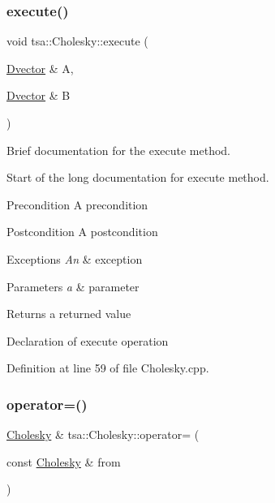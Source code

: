 \subsubsection{\texorpdfstring{execute()}{execute()}}
{\footnotesize\ttfamily void tsa\+::\+Cholesky\+::execute (\begin{DoxyParamCaption}\item[{\hyperlink{namespacetsa_a8900fb03d849baf447a1a0efe2561fb2}{Dvector} \&}]{A,  }\item[{\hyperlink{namespacetsa_a8900fb03d849baf447a1a0efe2561fb2}{Dvector} \&}]{B }\end{DoxyParamCaption})}



Brief documentation for the execute method. 

Start of the long documentation for execute method.

\begin{DoxyPrecond}{Precondition}
A precondition 
\end{DoxyPrecond}
\begin{DoxyPostcond}{Postcondition}
A postcondition 
\end{DoxyPostcond}

\begin{DoxyExceptions}{Exceptions}
{\em An} & exception\\
\hline
\end{DoxyExceptions}

\begin{DoxyParams}{Parameters}
{\em a} & parameter\\
\hline
\end{DoxyParams}
\begin{DoxyReturn}{Returns}
a returned value
\end{DoxyReturn}
Declaration of execute operation 

Definition at line 59 of file Cholesky.\+cpp.

\mbox{\label{classtsa_1_1_cholesky_a3c86b3ab61a3dd759b067ce685e6f51e}} 
\subsubsection{\texorpdfstring{operator=()}{operator=()}}
{\footnotesize\ttfamily \hyperlink{classtsa_1_1_cholesky}{Cholesky} \& tsa\+::\+Cholesky\+::operator= (\begin{DoxyParamCaption}\item[{const \hyperlink{classtsa_1_1_cholesky}{Cholesky} \&}]{from }\end{DoxyParamCaption})}


